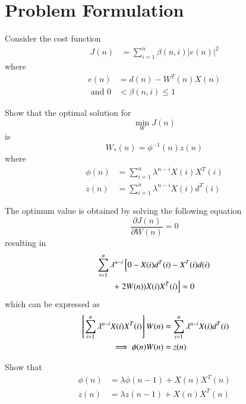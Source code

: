 \documentclass[journal,12pt,twocolumn]{IEEEtran}
\begin{document}
\section{Problem Formulation}
Consider the cost function 
%
\begin{align*}
J(n) &= \sum_{i=1}^{n} \beta (n,i) |e(n)|^2
\end{align*}
%
where
\begin{align}
e(n) &= d(n) - W^{T}(n)X(n)
\\
\text{ and }0 &<\beta (n,i)\leq 1
\end{align}
\begin{problem}
Show that the optimal solution for
%
\begin{equation}
\min_{W} J(n)
\end{equation}
is
\begin{equation}
\label{eq:optW}
W_{*}(n) =\phi ^{-1} (n) z(n)
\end{equation}
where 
\begin{align}
\phi (n) &= \sum_{i=1}^{n} \lambda ^{n-i}X(i)X^{T}(i)
\\
z(n) &= \sum_{i=1}^{n} \lambda ^{n-i}X(i)d^{T}(i)
\end{align}
\end{problem}
\solution The optimum value is obtained by solving the following equation
\begin{equation}
\frac{\partial J(n)}{\partial W(n)}=0
\end{equation}
resulting in
\begin{multline}
\sum_{i=1}^{n} \lambda ^{n-i}{}\left[0 - X(i)d^{T}(i)-X^{T}(i)d(i)\right.
\\
+{}\left.2W(n))X(i)X^{T}(i)\right]=0
\end{multline}
which can be expressed as
\begin{align}
{}\left[\sum_{i=1}^{n} \lambda ^{n-i}X(i)X^{T}(i)\right]W(n)&=\sum_{i=1}^{n} \lambda ^{n-i}X(i)d^{T}(i)\\
\implies \phi (n) W(n) &=z(n)
\end{align}
\begin{problem}
Show that
\begin{align}
\label{eq:phin}
\phi (n)&=\lambda \phi (n-1) + X(n)X^{T}(n)
\\
z(n)&=\lambda z(n-1) + X(n)X^{T}(n)
\label{eq:zn}
\end{align}
\end{problem}
\end{document}
